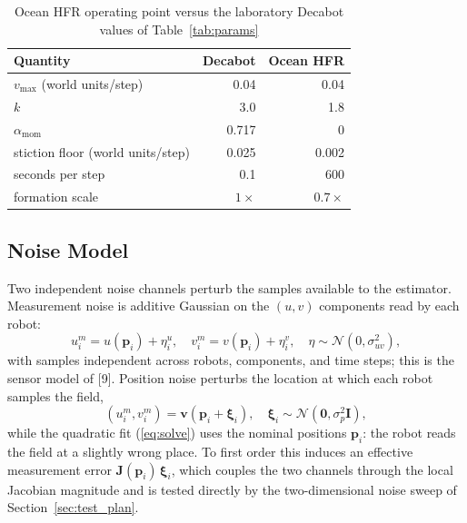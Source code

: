 \documentclass[lettersize,journal]{IEEEtran}
\begin{document}
\begin{table}[!t]
\centering
\caption{Ocean HFR operating point versus the laboratory Decabot values of Table~\ref{tab:params}}
\label{tab:ocean_params}
\footnotesize
\setlength{\tabcolsep}{4pt}
\begin{tabular}{lrr}
\hline
\textbf{Quantity} & \textbf{Decabot} & \textbf{Ocean HFR} \\
\hline
$v_{\max}$ (world units/step) & 0.04 & 0.04 \\
$k$ & 3.0 & 1.8 \\
$\alpha_{\text{mom}}$ & 0.717 & 0 \\
stiction floor (world units/step) & 0.025 & 0.002 \\
seconds per step & 0.1 & 600 \\
formation scale & $1\times$ & $0.7\times$ \\
\hline
\end{tabular}
\end{table}

\subsection{Noise Model}
\label{sec:noise_model}

Two independent noise channels perturb the samples available to the
estimator. Measurement noise is additive Gaussian on the $(u, v)$
components read by each robot:
\begin{equation}
    u_i^m = u(\mathbf{p}_i) + \eta_i^u, \quad
    v_i^m = v(\mathbf{p}_i) + \eta_i^v,
    \quad \eta \sim \mathcal{N}(0, \sigma_{uv}^2),
    \label{eq:meas_noise}
\end{equation}
with samples independent across robots, components, and time steps; this
is the sensor model of [9]. Position noise perturbs the location at
which each robot samples the field,
\begin{equation}
    (u_i^m, v_i^m) = \mathbf{v}(\mathbf{p}_i + \boldsymbol{\xi}_i), \quad
    \boldsymbol{\xi}_i \sim \mathcal{N}(\mathbf{0}, \sigma_p^2 \mathbf{I}),
    \label{eq:pos_noise}
\end{equation}
while the quadratic fit (\ref{eq:solve}) uses the nominal positions
$\mathbf{p}_i$: the robot reads the field at a slightly wrong place. To
first order this induces an effective measurement error
$\mathbf{J}(\mathbf{p}_i)\,\boldsymbol{\xi}_i$, which couples the two
channels through the local Jacobian magnitude and is tested directly by
the two-dimensional noise sweep of Section~\ref{sec:test_plan}.
\end{document}
